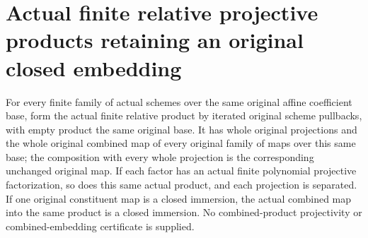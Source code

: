 \section{Actual finite relative projective products retaining an original closed embedding}
\label{sec:finite-relative-projective-products}

\begin{theorem}
\label{thm:finite-relative-projective-products}
\leanok
{}
For every finite family of actual schemes over the same original
affine coefficient base, form the actual finite relative product
by iterated original scheme pullbacks, with empty product the
same original base. It has whole original projections and the
whole original combined map of every original family of maps
over this same base; the composition with every whole projection
is the corresponding unchanged original map. If each factor has
an actual finite polynomial projective factorization, so does
this same actual product, and each projection is separated.
If one original constituent map is a closed immersion, the
actual combined map into the same product is a closed immersion.
No combined-product projectivity or combined-embedding certificate
is supplied.
\end{theorem}

